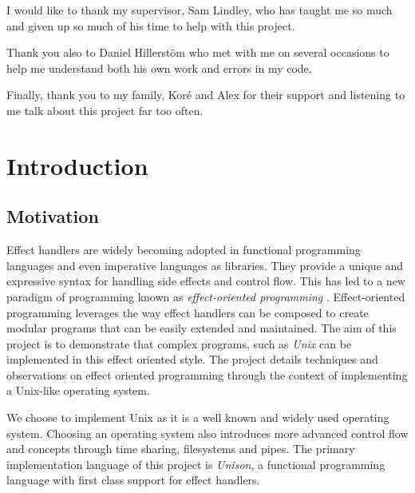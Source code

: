 \documentclass[logo,bsc,singlespacing,parskip]{infthesis}
\begin{document}
\begin{preliminary}
\begin{ethics}
\standarddeclaration
\end{ethics}

\begin{acknowledgements}
  I would like to thank my supervisor, Sam Lindley, who has taught me so much
  and given up so much of his time to help with this project.

  Thank you also to Daniel Hillerst\"{o}m who met with me on several occasions
  to help me understand both his own work and errors in my code.

  Finally, thank you to my family, Kor\'{e} and Alex for their support and
  listening to me talk about this project far too often.
\end{acknowledgements}

\tableofcontents

\end{preliminary}

\chapter{Introduction}

\section{Motivation}

Effect handlers \cite{plotkin2002computational} are widely becoming adopted in
functional programming languages \cite{DBLP:journals/corr/Leijen14} and even
imperative languages as libraries. They provide a unique and expressive syntax
for handling side effects and control flow. This has led to a new paradigm of
programming known as \emph{effect-oriented programming}
\cite{pretnar2015introduction}. Effect-oriented programming leverages the way
effect handlers can be composed to create modular programs that can be easily
extended and maintained. The aim of this project is to demonstrate that complex
programs, such as \emph{Unix} \cite{ritchie1978unix} can be implemented in this
effect oriented style. The project details techniques and observations on
effect oriented programming through the context of implementing a Unix-like
operating system.

We choose to implement Unix as it is a well known and widely used operating
system. Choosing an operating system also introduces more advanced control flow
and concepts through time sharing, filesystems and pipes. The primary
implementation language of this project is \emph{Unison}, a functional
programming language with first class support for effect handlers.
\end{document}
